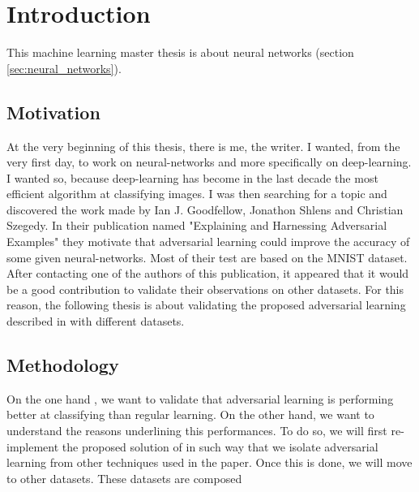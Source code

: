 
\section{Introduction} 
\label{sec:introduction}
	
	This machine learning master thesis is about neural networks (section \ref{sec:neural_networks}). 


	\subsection{Motivation}
		At the very beginning of this thesis, there is me, the writer. I wanted, from the very first day, to work on neural-networks and more specifically on deep-learning. I wanted so, because deep-learning has become in the last decade the most efficient algorithm at classifying images. 
		I was then searching for a topic and discovered the work made by Ian J. Goodfellow, Jonathon Shlens and Christian Szegedy. In their publication named "Explaining and Harnessing Adversarial Examples"\cite{goodfellow2014explaining} they motivate that adversarial learning could improve the accuracy of some given neural-networks. Most of their test are based on the MNIST dataset\cite{lecun-mnist}. After contacting one of the authors of this publication, it appeared that it would be a good contribution to validate their observations on other datasets. For this reason, the following thesis is about validating the proposed adversarial learning described in \cite{goodfellow2014explaining} with different datasets.

	\subsection{Methodology}
		On the one hand , we want to validate that adversarial learning is performing better at classifying than regular learning. On the other hand, we  want to understand the reasons underlining this performances. To do so, we will first re-implement the proposed solution of \cite{goodfellow2014explaining} in such way that we isolate adversarial learning from other techniques used in the paper. Once this is done, we will move to other datasets. These datasets are composed 


